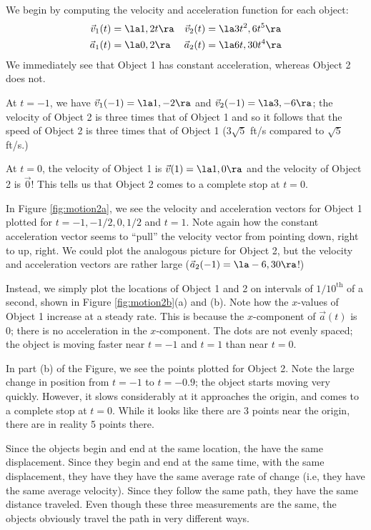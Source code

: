 {We begin by computing the velocity and acceleration function for each object:
\begin{align*}
\vec v_1(t) &= \la 1,2t\ra & \vec v_2(t) &= \la 3t^2,6t^5\ra \\
\vec a_1(t) &= \la 0,2\ra & \vec a_2(t) &=\la 6t,30t^4\ra
\end{align*}
We immediately see that Object 1 has constant acceleration, whereas Object 2 does not. 

At $t=-1$, we have $\vec v_1(-1) = \la 1,-2\ra$ and $\vec v_2(-1) = \la 3,-6\ra$; the velocity of Object 2 is three times that of Object 1 and so it follows that the speed of Object 2 is three times that of Object 1 ($3\sqrt{5}$ ft/s compared to $\sqrt{5}$ ft/s.)

At $t=0$, the velocity of Object 1 is $\vec v(1) = \la 1,0\ra$ and the velocity of Object 2 is $\vec 0$! This tells us that Object 2 comes to a complete stop at $t=0$. 

In Figure \ref{fig:motion2a}, we see the velocity and acceleration vectors for Object 1 plotted for $t=-1, -1/2, 0, 1/2$ and $t=1$. Note again how the constant acceleration vector seems to ``pull'' the velocity vector from pointing down, right to up, right. We could plot the analogous picture for Object 2, but the velocity and acceleration vectors are rather large ($\vec a_2(-1) = \la -6,30\ra$!) 

Instead, we simply plot the locations of Object 1 and 2  on intervals of $1/10^{\text{th}}$ of a second, shown in Figure \ref{fig:motion2b}(a) and (b). Note how the $x$-values of Object 1 increase at a steady rate. This is because the $x$-component of $\vec a(t)$ is 0; there is no acceleration in the $x$-component. The dots are not evenly spaced; the object is moving faster near $t=-1$ and $t=1$ than near $t=0$.


In part (b) of the Figure, we see the points plotted for Object 2. Note the large change in position from $t=-1$ to $t=-0.9$; the object starts moving very quickly. However, it slows considerably at it approaches the origin, and comes to a complete stop at $t=0$. While it looks like there are 3 points near the origin, there are in reality 5 points there.

Since the objects begin and end at the same location, the have the same displacement. Since they begin and end at the same time, with the same displacement, they have they have the same average rate of change (i.e, they have the same average velocity). Since they follow the same path, they have the same distance traveled. Even though these three measurements are the same, the objects obviously travel the path in very different ways.
}\\

